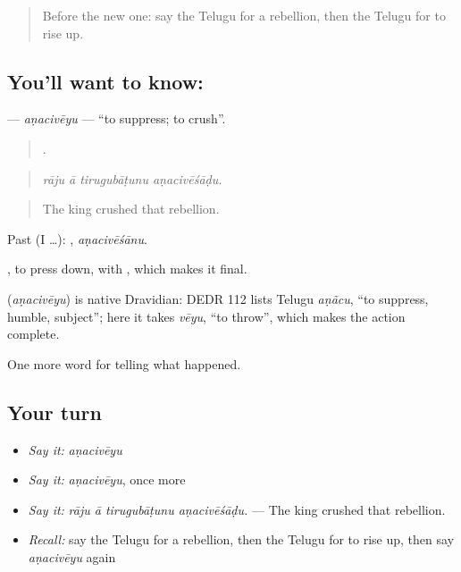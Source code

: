 \label{lesson:TE-C363-anaciveyu}



\begin{quote}
Before the new one: say the Telugu for a rebellion, then the Telugu for to rise up.
\end{quote}

\subsection*{You'll want to know: }
\textbf{} — \emph{aṇacivēyu} — \textquotedblleft{}to suppress; to crush\textquotedblright{}.

\begin{quote}
   .
\end{quote}

\begin{quote}
\emph{rāju ā tirugubāṭunu aṇacivēśāḍu.}
\end{quote}

\begin{quote}
The king crushed that rebellion.
\end{quote}

Past (I …): , \emph{aṇacivēśānu}.

, to press down, with , which makes it final.

\begin{cousinweb}
\textbf{} (\emph{aṇacivēyu}) is native Dravidian: DEDR 112 lists Telugu \emph{aṇãcu}, \textquotedblleft{}to suppress, humble, subject\textquotedblright{}; here it takes \emph{vēyu}, \textquotedblleft{}to throw\textquotedblright{}, which makes the action complete.
\end{cousinweb}

\begin{grammarlens}[title={What you've built}]
One more word for telling what happened.
\end{grammarlens}

\subsection*{Your turn}
\begin{itemize}
\raggedright
  \item \emph{Say it:} \emph{aṇacivēyu}
  \item \emph{Say it:} \emph{aṇacivēyu}, once more
  \item \emph{Say it:} \emph{rāju ā tirugubāṭunu aṇacivēśāḍu.} — The king crushed that rebellion.
  \item \emph{Recall:} say the Telugu for a rebellion, then the Telugu for to rise up, then say \emph{aṇacivēyu} again
\end{itemize}

